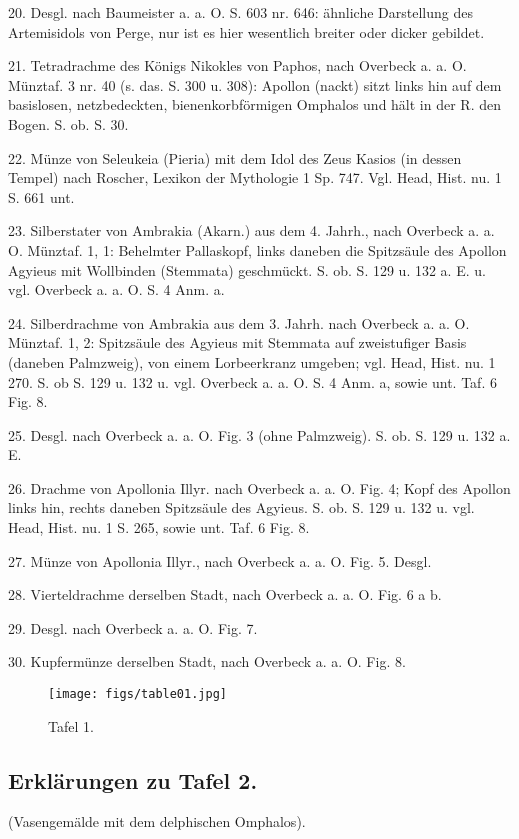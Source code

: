 \documentclass[a4paper, 11pt, oneside]{article}
\begin{document}
20. Desgl. nach Baumeister a. a. O. S. 603 nr. 646: ähnliche Darstellung des Artemisidols von Perge, nur ist es hier wesentlich breiter oder dicker gebildet.

21. Tetradrachme des Königs Nikokles von Paphos, nach Overbeck a. a. O. Münztaf. 3 nr. 40 (s. das. S. 300 u. 308): Apollon (nackt) sitzt links hin auf dem basislosen, netzbedeckten, bienenkorbförmigen Omphalos und hält in der R. den Bogen. S. ob. S. 30.

22. Münze von Seleukeia (Pieria) mit dem Idol des Zeus Kasios (in dessen Tempel) nach Roscher, Lexikon der Mythologie 1 Sp. 747. Vgl. Head, Hist. nu. 1 S. 661 unt.

23. Silberstater von Ambrakia (Akarn.) aus dem 4. Jahrh., nach Overbeck a. a. O. Münztaf. 1, 1: Behelmter Pallaskopf, links daneben die Spitzsäule des Apollon Agyieus mit Wollbinden (Stemmata) geschmückt. S. ob. S. 129 u. 132 a. E. u. vgl. Overbeck a. a. O. S. 4 Anm. a.

24. Silberdrachme von Ambrakia aus dem 3. Jahrh. nach Overbeck a. a. O. Münztaf. 1, 2: Spitzsäule des Agyieus mit Stemmata auf zweistufiger Basis (daneben Palmzweig), von einem Lorbeerkranz umgeben; vgl. Head, Hist. nu. 1 270. S. ob S. 129 u. 132 u. vgl. Overbeck a. a. O. S. 4 Anm. a, sowie unt. Taf. 6 Fig. 8.

25. Desgl. nach Overbeck a. a. O. Fig. 3 (ohne Palmzweig). S. ob. S. 129 u. 132 a. E.

26. Drachme von Apollonia Illyr. nach Overbeck a. a. O. Fig. 4; Kopf des Apollon links hin, rechts daneben Spitzsäule des Agyieus. S. ob. S. 129 u. 132 u. vgl. Head, Hist. nu. 1 S. 265, sowie unt. Taf. 6 Fig. 8.

27. Münze von Apollonia Illyr., nach Overbeck a. a. O. Fig. 5. Desgl.

28. Vierteldrachme derselben Stadt, nach Overbeck a. a. O. Fig. 6 a b.

29. Desgl. nach Overbeck a. a. O. Fig. 7.

30. Kupfermünze derselben Stadt, nach Overbeck a. a. O. Fig. 8.
\clearpage
\vspace*{\fill}
\begin{figure}[H]
\centering
\texttt{[image: figs/table01.jpg]}
\caption{\swabfamily Tafel 1.}
\end{figure}
\vspace*{\fill}
\clearpage
\subsection{Erklärungen zu Tafel 2.}
\begin{center}
(Vasengemälde mit dem delphischen Omphalos).
\end{center}
\end{document}
